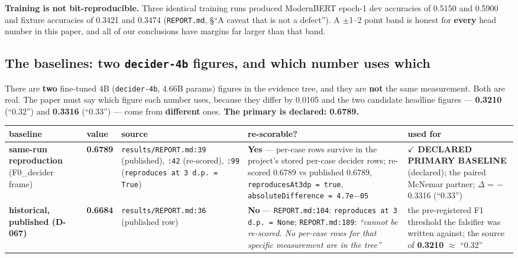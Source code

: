 \documentclass[10pt]{article}
\begin{document}
\textbf{Training is not bit-reproducible.} Three identical training runs produced ModernBERT epoch-1 dev accuracies of 0.5150 and 0.5900 and fixture accuracies of 0.3421 and 0.3474 (\texttt{REPORT.md}, \S``A caveat that is not a defect''). A $\pm$1--2 point band is honest for \textbf{every} head number in this paper, and all of our conclusions have margins far larger than that band.

\subsection{The baselines: two \texttt{decider-4b} figures, and which number uses which}

There are \textbf{two} fine-tuned 4B (\texttt{decider-4b}, 4.66B params) figures in the evidence tree, and they are \textbf{not} the same measurement. Both are real. The paper must say which figure each number uses, because they differ by 0.0105 and the two candidate headline figures --- \textbf{0.3210} (``0.32'') and \textbf{0.3316} (``0.33'') --- come from \textbf{different} ones. \textbf{The primary is declared: 0.6789.}

\footnotesize

\begin{center}
\begin{tabular}{@{}>{\raggedright\arraybackslash}p{}>{\raggedright\arraybackslash}p{}>{\raggedright\arraybackslash}p{}>{\raggedright\arraybackslash}p{}>{\raggedright\arraybackslash}p{}@{}}
\hline
\textbf{baseline} & \textbf{value} & \textbf{source} & \textbf{re-scorable?} & \textbf{used for} \\ \hline
\textbf{same-run reproduction} (F0\_decider frame) & \textbf{0.6789} & \texttt{results/REPORT.md:39} (published), \texttt{:42} (re-scored), \texttt{:99} (\texttt{reproduces at 3 d.p. = True}) & \textbf{Yes} --- per-case rows survive in the project's stored per-case decider rows; re-scored 0.6789 vs published 0.6789, \texttt{reproducesAt3dp = true}, \texttt{absoluteDifference = 4.7e$-$05} & \textbf{$\checkmark$ DECLARED PRIMARY BASELINE} (declared); the paired McNemar partner; $\Delta$ = $-$0.3316 (``0.33'') \\ \hline
\textbf{historical, published (D-067)} & \textbf{0.6684} & \texttt{results/REPORT.md:36} (published row) & \textbf{No} --- \texttt{REPORT.md:104}: \texttt{reproduces at 3 d.p. = None}; \texttt{REPORT.md:189}: \emph{``cannot be re-scored. No per-case rows for that specific measurement are in the tree''} & the pre-registered F1 threshold the falsifier was written against; the source of \textbf{0.3210} $\approx$ ``0.32'' \\ \hline
\end{tabular}
\end{center}
\end{document}
